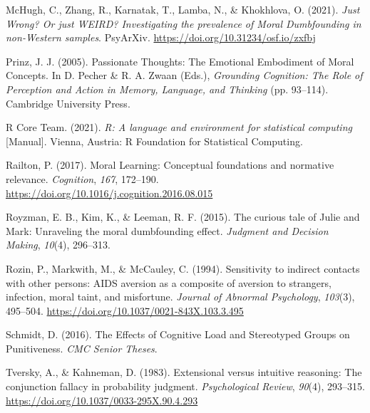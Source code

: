 \documentclass[
  man,floatsintext]{apa6}
\newlength{\cslhangindent}
\newlength{\cslentryspacingunit} %
\newenvironment{CSLReferences}[2] %
 {%
  \setlength{\parindent}{0pt}
  \ifodd #1
  \let\oldpar\par
  \def\par{\hangindent=\cslhangindent\oldpar}
  \fi
  \setlength{\parskip}{#2\cslentryspacingunit}
 }%
 {}
\begin{document}
\begin{CSLReferences}{1}{0}
\leavevmode{}%
McHugh, C., Zhang, R., Karnatak, T., Lamba, N., \& Khokhlova, O. (2021). \emph{Just {Wrong}? {Or} just {WEIRD}? {Investigating} the prevalence of {Moral Dumbfounding} in non-{Western} samples}. {PsyArXiv}. \url{https://doi.org/10.31234/osf.io/zxfbj}

\leavevmode{}%
Prinz, J. J. (2005). Passionate {Thoughts}: {The Emotional Embodiment} of {Moral Concepts}. In D. Pecher \& R. A. Zwaan (Eds.), \emph{Grounding {Cognition}: {The Role} of {Perception} and {Action} in {Memory}, {Language}, and {Thinking}} (pp. 93--114). {Cambridge University Press}.

\leavevmode{}%
R Core Team. (2021). \emph{R: {A} language and environment for statistical computing} {[}Manual{]}. {Vienna, Austria}: {R Foundation for Statistical Computing}.

\leavevmode{}%
Railton, P. (2017). Moral {Learning}: {Conceptual} foundations and normative relevance. \emph{Cognition}, \emph{167}, 172--190. \url{https://doi.org/10.1016/j.cognition.2016.08.015}

\leavevmode{}%
Royzman, E. B., Kim, K., \& Leeman, R. F. (2015). The curious tale of {Julie} and {Mark}: {Unraveling} the moral dumbfounding effect. \emph{Judgment and Decision Making}, \emph{10}(4), 296--313.

\leavevmode{}%
Rozin, P., Markwith, M., \& McCauley, C. (1994). Sensitivity to indirect contacts with other persons: {AIDS} aversion as a composite of aversion to strangers, infection, moral taint, and misfortune. \emph{Journal of Abnormal Psychology}, \emph{103}(3), 495--504. \url{https://doi.org/10.1037/0021-843X.103.3.495}

\leavevmode{}%
Schmidt, D. (2016). The {Effects} of {Cognitive Load} and {Stereotyped Groups} on {Punitiveness}. \emph{CMC Senior Theses}.

\leavevmode{}%
Tversky, A., \& Kahneman, D. (1983). Extensional versus intuitive reasoning: The conjunction fallacy in probability judgment. \emph{Psychological Review}, \emph{90}(4), 293--315. \url{https://doi.org/10.1037/0033-295X.90.4.293}

\end{CSLReferences}
\end{document}
